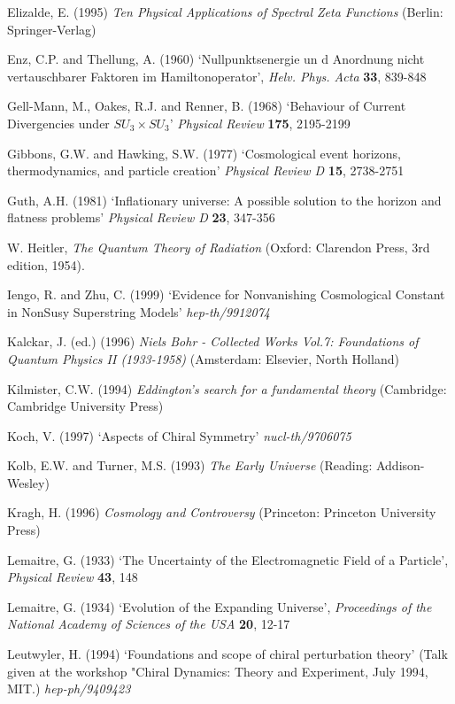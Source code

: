 \documentclass[12pt]{article}
\begin{document}
\begin{thebibliography}{X}
 Elizalde, E. (1995) {\em Ten Physical 
Applications of Spectral Zeta Functions} (Berlin: Springer-Verlag)

 Enz, C.P. and Thellung, A. (1960) `Nullpunktsenergie un d 
Anordnung nicht vertauschbarer Faktoren im Hamiltonoperator', 
{\em Helv. Phys. Acta} {\bf 33}, 839-848

 Gell-Mann, M., Oakes, R.J. and Renner, B. (1968)
`Behaviour of Current Divergencies under $SU_3\times SU_3$'
{\em Physical Review} {\bf 175}, 2195-2199

 Gibbons, G.W. and Hawking, S.W. (1977) 
`Cosmological event horizons, thermodynamics, and particle creation'
{\em Physical Review D} {\bf 15}, 2738-2751

 Guth, A.H. (1981) `Inflationary universe: A possible
solution to the horizon and flatness problems'
{\em Physical Review D} {\bf 23}, 347-356

 W. Heitler,
{\em The Quantum Theory of Radiation}
(Oxford: Clarendon Press, 3rd edition, 1954).

 Iengo, R. and Zhu, C. (1999) 
`Evidence for Nonvanishing Cosmological Constant in NonSusy
Superstring Models' {\em hep-th/9912074}

 Kalckar, J.  (ed.) (1996)
{\em Niels Bohr - Collected Works Vol.7: Foundations of Quantum Physics
II (1933-1958)} (Amsterdam: Elsevier, North Holland)

Kilmister, C.W. (1994) {\em Eddington's search for a fundamental theory}
(Cambridge: Cambridge University Press)

Koch, V. (1997) `Aspects of Chiral Symmetry' {\em nucl-th/9706075} 

 Kolb, E.W. and Turner, M.S. (1993) {\em The
Early Universe} (Reading: Addison-Wesley) 

Kragh, H. (1996) {\em Cosmology and Controversy} (Princeton: Princeton
University Press)

 Lemaitre, G. (1933) `The Uncertainty of the
Electromagnetic Field of a Particle', {\em Physical Review} {\bf 43}, 148

Lemaitre, G. (1934) `Evolution of the Expanding Universe', 
{\em Proceedings of the National Academy of Sciences of the USA} 
{\bf 20}, 12-17   

 Leutwyler, H.  (1994) `Foundations and scope
of chiral perturbation theory' (Talk
given at the workshop "Chiral Dynamics: Theory and Experiment, July
1994, MIT.) {\em hep-ph/9409423} 


\end{thebibliography}
\end{document}
